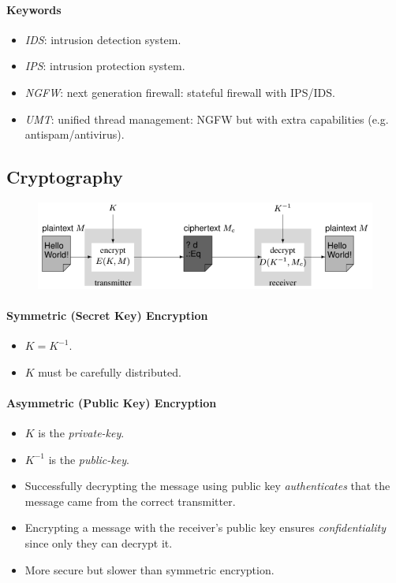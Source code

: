 \documentclass[twocolumn,english]{article}
\begin{document}
\paragraph{Keywords}
\begin{itemize}
\item \emph{IDS}: intrusion detection system.
\item \emph{IPS}: intrusion protection system.
\item \emph{NGFW}: next generation firewall: stateful firewall with IPS/IDS.
\item \emph{UMT}: unified thread management: NGFW but with extra capabilities
(e.g. antispam/antivirus).
\end{itemize}

\subsection{Cryptography}

\begin{figure}[H]
\centering{}\includegraphics[width=0.75\linewidth]{img/encryption}
\end{figure}

\paragraph{Symmetric (Secret Key) Encryption}
\begin{itemize}
\item $K=K^{-1}$.
\item $K$ must be carefully distributed.
\end{itemize}

\paragraph{Asymmetric (Public Key) Encryption}
\begin{itemize}
\item $K$ is the \emph{private-key}.
\item $K^{-1}$ is the \emph{public-key}.
\item Successfully decrypting the message using public key \emph{authenticates}
that the message came from the correct transmitter.
\item Encrypting a message with the receiver's public key ensures \emph{confidentiality}
since only they can decrypt it.
\item More secure but slower than symmetric encryption.
\end{itemize}
\end{document}
